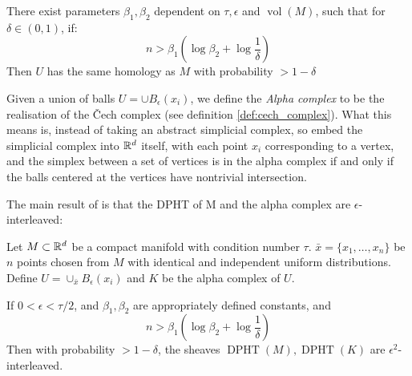 \begin{theorem}
    There exist parameters \(\beta_1,\beta_2\) dependent on \(\tau,\epsilon\) and \(\operatorname{vol}(M)\), such that for \(\delta\in(0,1)\), if:
    \[n>\beta_1\left(\log\beta_2+\log\frac 1\delta\right)\]
    Then \(U\) has the same homology as \(M\) with probability \(>1-\delta\)
\end{theorem}

Given a union of balls \(U=\cup B_\epsilon(x_i)\), we define the \textit{Alpha complex} to be the realisation of the \v{C}ech complex (see definition \ref{def:cech_complex}). What this means is, instead of taking an abstract simplicial complex, so embed the simplicial complex into \(\mathbb{R}^d\) itself, with each point \(x_i\) corresponding to a vertex, and the simplex between a set of vertices is in the alpha complex if and only if the balls centered at the vertices have nontrivial intersection.

The main result of \cite{Arya2022ShapeSpace} is that the DPHT of M and the alpha complex are \(\epsilon\)-interleaved:

\begin{theorem}
    Let \(M\subset \mathbb{R}^d\) be a compact manifold with condition number \(\tau\). \(\bar{x}=\{x_1,\dots,x_n\}\) be \(n\) points chosen from \(M\) with identical and independent uniform distributions. Define \(U=\cup_{\bar x} B_\epsilon(x_i)\) and \(K\) be the alpha complex of \(U\). 

    If \(0<\epsilon<\tau/2\), and \(\beta_1, \beta_2\) are appropriately defined constants, and 
    \[n>\beta_1\left(\log\beta_2+\log\frac 1\delta\right)\]
    Then with probability \(>1-\delta\), the sheaves \(\operatorname{DPHT}(M), \operatorname{DPHT}(K)\) are \(\epsilon^2\)-interleaved.
\end{theorem}